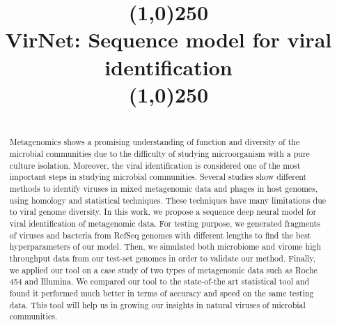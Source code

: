 \documentclass[conference]{IEEEtran}
\begin{document}
\title{\line(1,0){250}\\VirNet: Sequence model for viral identification\\ \line(1,0){250}}


\author{
\and
{}
\and
{}
\and
{}
\and
{}
}

\maketitle

\begin{abstract}\\Metagenomics shows a promising understanding of function and diversity of the microbial communities due to the difficulty of studying microorganism with a pure culture isolation. Moreover, the viral identification is considered one of the most important steps in studying microbial communities. Several studies show different methods to identify viruses in mixed metagenomic data and phages in host genomes, using homology and statistical techniques. These techniques have many limitations due to viral genome diversity. In this work, we propose a sequence deep neural model for viral identification of metagenomic data. For testing purpose, we generated fragments of viruses and bacteria from RefSeq genomes with different lengths to find the best hyperparameters of our model. Then, we simulated both microbiome and virome high throughput data from our test-set genomes in order to validate our method. Finally, we applied our tool on a case study of two types of metagenomic data such as Roche 454 and Illumina. We compared our tool to the state-of-the art statistical tool and found it performed much better in terms of accuracy and speed on the same testing data. This tool will help us in growing our insights in natural viruses of microbial communities.
\end{abstract}
\end{document}
